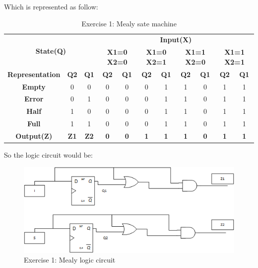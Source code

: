 Which is represented as follow:

\begin{table}[h!]
\centering
\begin{tabular}{|c|c|c|c|c|c|c|c|c|c|c|}
\hline
\multicolumn{3}{|c|}{\multirow{2}{*}{\textbf{State(Q)}}} & \multicolumn{8}{c|}{\textbf{Input(X)}} \\ \cline{4-11} 
\multicolumn{3}{|c|}{} & \multicolumn{2}{c|}{\textbf{X1=0 X2=0}} & \multicolumn{2}{c|}{\textbf{X1=0 X2=1}} & \multicolumn{2}{c|}{\textbf{X1=1 X2=0}} & \multicolumn{2}{c|}{\textbf{X1=1 X2=1}} \\ \hline
\textbf{Representation} & \textbf{Q2} & \textbf{Q1} & \textbf{Q2} & \textbf{Q1} & \textbf{Q2} & \textbf{Q1} & \textbf{Q2} & \textbf{Q1} & \textbf{Q2} & \textbf{Q1} \\ \hline
\textbf{Empty} & 0 & 0 & 0 & 0 & 0 & 1 & 1 & 0 & 1 & 1 \\ \hline
\textbf{Error} & 0 & 1 & 0 & 0 & 0 & 1 & 1 & 0 & 1 & 1 \\ \hline
\textbf{Half} & 1 & 0 & 0 & 0 & 0 & 1 & 1 & 0 & 1 & 1 \\ \hline
\textbf{Full} & 1 & 1 & 0 & 0 & 0 & 1 & 1 & 0 & 1 & 1 \\ \hline
\textbf{Output(Z)} & \textbf{Z1} & \textbf{Z2} & \textbf{0} & \textbf{0} & \textbf{1} & \textbf{1} & \textbf{1} & \textbf{0} & \textbf{1} & \textbf{1} \\ \hline
\end{tabular}
\caption{\color{cyan}Exercise 1: Mealy sate machine}
\end{table}

\pagebreak
So the logic circuit would be:

 \begin{figure}[h!]
        \centering
        \includegraphics[scale=1]{ej1mealycircuit.png}
        \caption{\color{cyan}Exercise 1: Mealy logic circuit}
        \label{fig:ej1mealyld}
    \end{figure}

